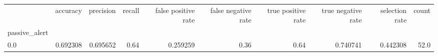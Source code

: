\begin{tabular}{lrrrrrrrrr}
\toprule
{} &  accuracy &  precision &  recall &  false positive rate &  false negative rate &  true positive rate &  true negative rate &  selection rate &  count \\
passive\_alert &           &            &         &                      &                      &                     &                     &                 &        \\
\midrule
0.0           &  0.692308 &   0.695652 &    0.64 &             0.259259 &                 0.36 &                0.64 &            0.740741 &        0.442308 &   52.0 \\
\bottomrule
\end{tabular}
